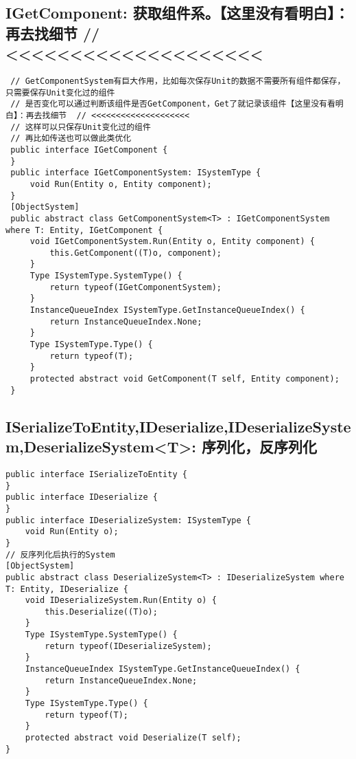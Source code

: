 \documentclass[9pt, b5paper]{article}
\begin{document}
\subsection{IGetComponent: 获取组件系。【这里没有看明白】：再去找细节  // <<<<<<<<<<<<<<<<<<<<}
\label{sec-2-15}
\begin{verbatim}
 // GetComponentSystem有巨大作用，比如每次保存Unit的数据不需要所有组件都保存，只需要保存Unit变化过的组件
 // 是否变化可以通过判断该组件是否GetComponent，Get了就记录该组件【这里没有看明白】：再去找细节  // <<<<<<<<<<<<<<<<<<<< 
 // 这样可以只保存Unit变化过的组件
 // 再比如传送也可以做此类优化
 public interface IGetComponent {
 }
 public interface IGetComponentSystem: ISystemType {
     void Run(Entity o, Entity component);
 }
 [ObjectSystem]
 public abstract class GetComponentSystem<T> : IGetComponentSystem where T: Entity, IGetComponent {
     void IGetComponentSystem.Run(Entity o, Entity component) {
         this.GetComponent((T)o, component);
     }
     Type ISystemType.SystemType() {
         return typeof(IGetComponentSystem);
     }
     InstanceQueueIndex ISystemType.GetInstanceQueueIndex() {
         return InstanceQueueIndex.None;
     }
     Type ISystemType.Type() {
         return typeof(T);
     }
     protected abstract void GetComponent(T self, Entity component);
 }
\end{verbatim}
\subsection{ISerializeToEntity,IDeserialize,IDeserializeSystem,DeserializeSystem<T>: 序列化，反序列化}
\label{sec-2-16}
\begin{verbatim}
public interface ISerializeToEntity {
}
public interface IDeserialize {
}
public interface IDeserializeSystem: ISystemType {
    void Run(Entity o);
}
// 反序列化后执行的System
[ObjectSystem]
public abstract class DeserializeSystem<T> : IDeserializeSystem where T: Entity, IDeserialize {
    void IDeserializeSystem.Run(Entity o) {
        this.Deserialize((T)o);
    }
    Type ISystemType.SystemType() {
        return typeof(IDeserializeSystem);
    }
    InstanceQueueIndex ISystemType.GetInstanceQueueIndex() {
        return InstanceQueueIndex.None;
    }
    Type ISystemType.Type() {
        return typeof(T);
    }
    protected abstract void Deserialize(T self);
}
\end{verbatim}
\end{document}

